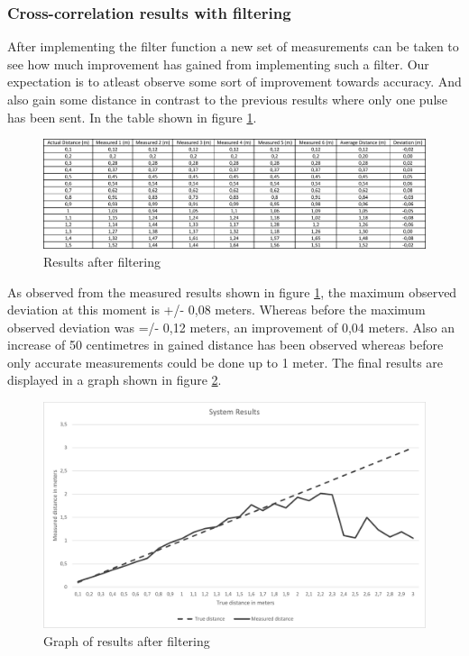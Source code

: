 \documentclass[10pt,a4paper]{article}
\begin{document}


\subsubsection{Cross-correlation results with filtering}
After implementing the filter function a new set of measurements can be taken to see how much improvement has gained from implementing such a filter. Our expectation is to atleast observe some sort of improvement towards accuracy. And also gain some distance in contrast to the previous results where only one pulse has been sent. In the table shown in figure \ref{fig:filterresults}.

\begin{figure}[H]
   \centering
   \includegraphics[width=\textwidth]{filterresult.pdf}
   \caption{Results after filtering}
   \label{fig:filterresults}
\end{figure}

As observed from the measured results shown in figure \ref{fig:filterresults}, the maximum observed deviation at this moment is +/- 0,08 meters. Whereas before the maximum observed deviation was =/- 0,12 meters, an improvement of 0,04 meters. Also an increase of 50 centimetres in gained distance has been observed whereas before only accurate measurements could be done up to 1 meter. The final results are displayed in a graph shown in figure \ref{fig:filtergraph}.

\begin{figure}[H]
   \centering
   \includegraphics[width=\textwidth]{filtergraph.pdf}
   \caption{Graph of results after filtering}
   \label{fig:filtergraph}
\end{figure}
\end{document}
